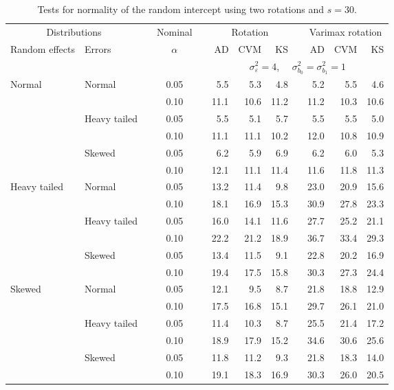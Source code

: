 \begin{table}[ht]
\caption{\label{tab:simb0s30-alt}Tests for normality of the random intercept using two rotations and $s = 30$.}
\begin{scriptsize}
\begin{center}
\begin{tabular}{ll p{.1cm} c p{.1cm} rrr p{.1cm} rrr}
  \hline
  \multicolumn{2}{c}{Distributions}& & Nominal & &  \multicolumn{3}{c}{Rotation} & & \multicolumn{3}{c}{Varimax rotation} \\ \cline{1-2} \cline{6-8} \cline{10-12}   
  Random effects & Errors & & $\alpha$ & & AD & CVM & KS & & AD & CVM & KS \\ 
   \hline
& && && \multicolumn{7}{c}{$\sigma_{\varepsilon}^2 = 4$, \ \ $\sigma_{b_0}^2 = \sigma_{b_1}^2 = 1$} \\ \cline{6-12}
Normal       & Normal       && 0.05 &&   5.5 & 5.3 & 4.8 &   & 5.2 & 5.5 & 4.6 \\ 
             &              && 0.10 &&   11.1 & 10.6 & 11.2 &   & 11.2 & 10.3 & 10.6 \\ 
             & Heavy tailed && 0.05 &&   5.5 & 5.1 & 5.7 &   & 5.5 & 5.5 & 5.0 \\ 
             &              && 0.10 &&   11.1 & 11.1 & 10.2 &   & 12.0 & 10.8 & 10.9 \\ 
             & Skewed       && 0.05 &&   6.2 & 5.9 & 6.9 &   & 6.2 & 6.0 & 5.3 \\ 
             &              && 0.10 &&   12.1 & 11.1 & 11.4 &   & 11.6 & 11.8 & 11.3 \\ 
Heavy tailed & Normal       && 0.05 &&   13.2 & 11.4 & 9.8 &   & 23.0 & 20.9 & 15.6 \\ 
             &              && 0.10 &&   18.1 & 16.9 & 15.3 &   & 30.9 & 27.8 & 23.3 \\ 
             & Heavy tailed && 0.05 &&   16.0 & 14.1 & 11.6 &   & 27.7 & 25.2 & 21.1 \\ 
             &              && 0.10 &&   22.2 & 21.2 & 18.9 &   & 36.7 & 33.4 & 29.3 \\ 
             & Skewed       && 0.05 &&   13.4 & 11.5 & 9.1 &   & 22.8 & 20.2 & 16.9 \\ 
             &              && 0.10 &&   19.4 & 17.5 & 15.8 &   & 30.3 & 27.3 & 24.4 \\ 
Skewed       & Normal       && 0.05 &&   12.1 & 9.5 & 8.7 &   & 21.8 & 18.8 & 12.9 \\ 
             &              && 0.10 &&   17.5 & 16.8 & 15.1 &   & 29.7 & 26.1 & 21.0 \\ 
             & Heavy tailed && 0.05 &&   11.4 & 10.3 & 8.7 &   & 25.5 & 21.4 & 17.2 \\ 
             &              && 0.10 &&   18.9 & 17.9 & 15.2 &   & 34.6 & 30.6 & 25.6 \\ 
             & Skewed       && 0.05 &&   11.8 & 11.2 & 9.3 &   & 21.8 & 18.3 & 14.0 \\ 
             &              && 0.10 &&   19.1 & 18.3 & 16.9 &   & 30.3 & 26.0 & 20.5 \\ 


\end{tabular}
\end{center}
\end{scriptsize}
\end{table}

